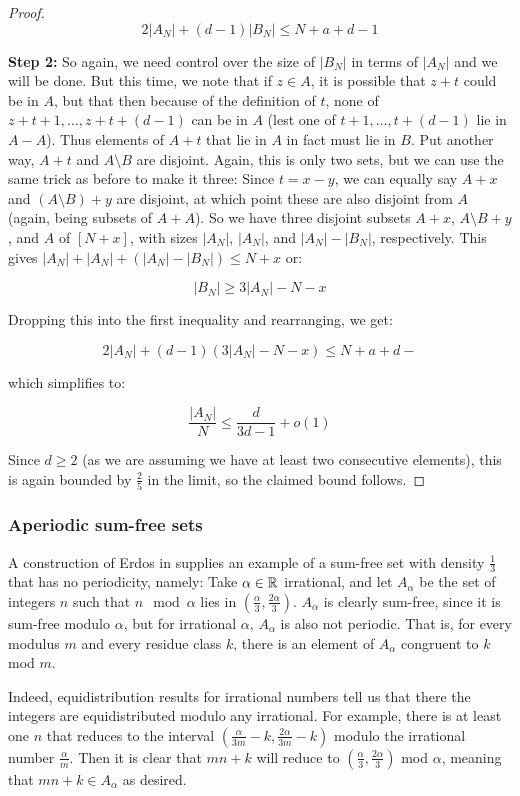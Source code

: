 \documentclass{article}
\theoremstyle{definition}
\theoremstyle{remark}
\numberwithin{equation}{section}
\begin{document}
\begin{proof}
\[2|A_N|+(d-1)|B_N| \leq N+a+d-1\]

\textbf{Step 2: }So again, we need control over the size of $|B_N|$ in
terms of $|A_N|$ and we will be done.  But this time, we note that if
$z \in A$, it is possible that $z+t$ could be in $A$, but that then
because of the definition of $t$, none of $z+t+1, \ldots, z+t+(d-1)$
can be in $A$ (lest one of $t+1, \ldots, t+(d-1)$ lie in $A-A$).  Thus
elements of $A+t$ that lie in $A$ in fact must lie in $B$.  Put another
way, $A+t$ and $A \setminus B$ are disjoint.  Again, this is only two
sets, but we can use the same trick as before to make it three: Since
$t = x-y$, we can equally say $A+x$ and $(A \setminus B) + y$ are
disjoint, at which point these are also disjoint from $A$ (again,
being subsets of $A+A$).  So we have three disjoint subsets $A+x$,
$A \setminus B + y$, and $A$ of $[N+x]$, with sizes $|A_N|$, $|A_N|$,
and $|A_N|-|B_N|$, respectively.  This gives
$|A_N| + |A_N| + (|A_N| - |B_N|) \leq N+x$ or:

\[|B_N| \geq 3|A_N|-N-x\]

Dropping this into the first inequality and rearranging, we get:

\[2|A_N|+(d-1)(3|A_N|-N-x) \leq N+a+d-\]

which simplifies to: 

\[\frac{|A_N|}{N} \leq \frac{d}{3d-1} + o(1)\]

Since $d \geq 2$ (as we are assuming we have at least two consecutive
elements), this is again bounded by $\frac25$ in the limit, so the
claimed bound follows.
\end{proof}

\subsubsection{Aperiodic sum-free sets}

A construction of Erdos in \cite{aperiodic_sumfree_erdos} supplies an
example of a sum-free set with density $\frac13$ that has no
periodicity, namely: Take $\alpha \in \mathbb{R}$ irrational, and let
$A_\alpha$ be the set of integers $n$ such that $n \mod{\alpha}$ lies
in $\left(\frac \alpha 3, \frac {2\alpha}{3}\right)$.  $A_\alpha$ is
clearly sum-free, since it is sum-free modulo $\alpha$, but for
irrational $\alpha$, $A_\alpha$ is also not periodic.  That is, for
every modulus $m$ and every residue class $k$, there is an element of
$A_\alpha$ congruent to $k$ mod $m$.  

Indeed, equidistribution results for irrational numbers tell us that
there the integers are equidistributed modulo any irrational.  For
example, there is at least one $n$ that reduces to the interval
$\left(\frac{\alpha}{3m}-k,\frac{2\alpha}{3m}-k\right)$ modulo the
irrational number $\frac{\alpha}{m}$.  Then it is clear that $mn+k$
will reduce to $\left(\frac{\alpha}{3},\frac{2\alpha}{3}\right)$ mod
$\alpha$, meaning that $mn+k \in A_\alpha$ as desired.
\end{document}
